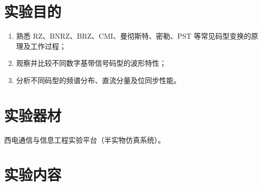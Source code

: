 \documentclass{xjtureport}
\begin{document}
	
	\begin{titlepage}
		
	\end{titlepage}
	
	
	
	\section{实验目的}
	\begin{enumerate}
		\item 熟悉 RZ、BNRZ、BRZ、CMI、曼彻斯特、密勒、PST 等常见码型变换的原理及工作过程；
		\item 观察并比较不同数字基带信号码型的波形特性；
		\item 分析不同码型的频谱分布、直流分量及位同步性能。
	\end{enumerate}
	
	\section{实验器材}
	西电通信与信息工程实验平台（半实物仿真系统）。
	
	
	\section{实验内容}
	
\end{document}
